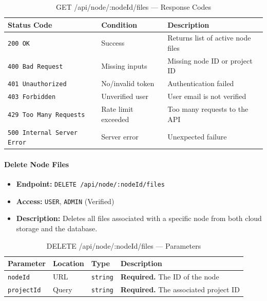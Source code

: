 \begin{table}[H]
\centering
\renewcommand{\arraystretch}{1.3}
\begin{tabularx}{\textwidth}{|l|l|X|}
\hline
\textbf{Status Code} & \textbf{Condition} & \textbf{Description} \\
\hline
\texttt{200 OK}           & Success          & Returns list of active node files \\
\hline
\texttt{400 Bad Request}  & Missing inputs   & Missing node ID or project ID \\
\hline
\texttt{401 Unauthorized} & No/invalid token & Authentication failed \\
\hline
\texttt{403 Forbidden}    & Unverified user  & User email is not verified \\
\hline
\texttt{429 Too Many Requests} & Rate limit exceeded & Too many requests to the API \\
\hline
\texttt{500 Internal Server Error} & Server error & Unexpected failure \\
\hline
\end{tabularx}
\caption{GET /api/node/:nodeId/files — Response Codes}
\label{tab:get-node-files-responses}
\end{table}
\FloatBarrier

\paragraph{Delete Node Files}
\label{subsubsec:delete-node-files}

\begin{itemize}
  \item \textbf{Endpoint:} \texttt{DELETE /api/node/:nodeId/files}
  \item \textbf{Access:} \texttt{USER}, \texttt{ADMIN} (Verified)
  \item \textbf{Description:} Deletes all files associated with a specific node from both cloud storage and the database.
\end{itemize}

\begin{table}[H]
\centering
\renewcommand{\arraystretch}{1.3}
\begin{tabularx}{\textwidth}{|l|l|l|X|}
\hline
\textbf{Parameter} & \textbf{Location} & \textbf{Type} & \textbf{Description} \\
\hline
\texttt{nodeId}    & URL   & \texttt{string}  & \textbf{Required.} The ID of the node \\
\hline
\texttt{projectId} & Query & \texttt{string}  & \textbf{Required.} The associated project ID \\
\hline
\end{tabularx}
\caption{DELETE /api/node/:nodeId/files — Parameters}
\label{tab:delete-node-files-params}
\end{table}

